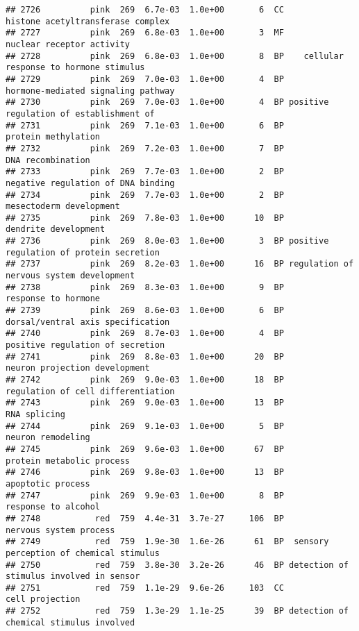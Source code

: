 \documentclass[]{article}
\begin{document}
\begin{verbatim}
## 2726          pink  269  6.7e-03  1.0e+00       6  CC        histone acetyltransferase complex
## 2727          pink  269  6.8e-03  1.0e+00       3  MF                nuclear receptor activity
## 2728          pink  269  6.8e-03  1.0e+00       8  BP    cellular response to hormone stimulus
## 2729          pink  269  7.0e-03  1.0e+00       4  BP       hormone-mediated signaling pathway
## 2730          pink  269  7.0e-03  1.0e+00       4  BP positive regulation of establishment of 
## 2731          pink  269  7.1e-03  1.0e+00       6  BP                      protein methylation
## 2732          pink  269  7.2e-03  1.0e+00       7  BP                        DNA recombination
## 2733          pink  269  7.7e-03  1.0e+00       2  BP       negative regulation of DNA binding
## 2734          pink  269  7.7e-03  1.0e+00       2  BP                  mesectoderm development
## 2735          pink  269  7.8e-03  1.0e+00      10  BP                     dendrite development
## 2736          pink  269  8.0e-03  1.0e+00       3  BP positive regulation of protein secretion
## 2737          pink  269  8.2e-03  1.0e+00      16  BP regulation of nervous system development
## 2738          pink  269  8.3e-03  1.0e+00       9  BP                      response to hormone
## 2739          pink  269  8.6e-03  1.0e+00       6  BP        dorsal/ventral axis specification
## 2740          pink  269  8.7e-03  1.0e+00       4  BP         positive regulation of secretion
## 2741          pink  269  8.8e-03  1.0e+00      20  BP            neuron projection development
## 2742          pink  269  9.0e-03  1.0e+00      18  BP       regulation of cell differentiation
## 2743          pink  269  9.0e-03  1.0e+00      13  BP                             RNA splicing
## 2744          pink  269  9.1e-03  1.0e+00       5  BP                        neuron remodeling
## 2745          pink  269  9.6e-03  1.0e+00      67  BP                protein metabolic process
## 2746          pink  269  9.8e-03  1.0e+00      13  BP                        apoptotic process
## 2747          pink  269  9.9e-03  1.0e+00       8  BP                      response to alcohol
## 2748           red  759  4.4e-31  3.7e-27     106  BP                   nervous system process
## 2749           red  759  1.9e-30  1.6e-26      61  BP  sensory perception of chemical stimulus
## 2750           red  759  3.8e-30  3.2e-26      46  BP detection of stimulus involved in sensor
## 2751           red  759  1.1e-29  9.6e-26     103  CC                          cell projection
## 2752           red  759  1.3e-29  1.1e-25      39  BP detection of chemical stimulus involved 

\end{verbatim}
\end{document}

